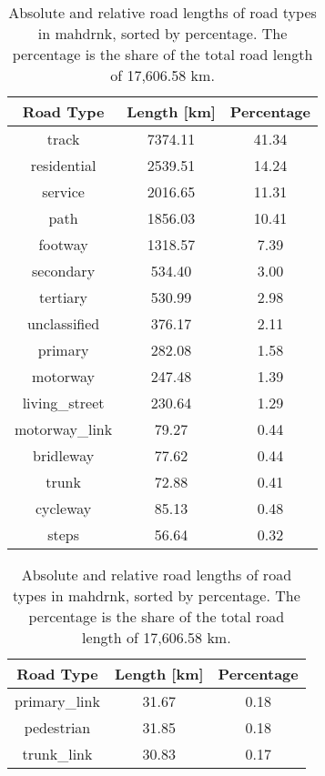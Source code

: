 \begin{table}[htb]
    \centering
    \caption[Road Lengths of ]{Absolute and relative road lengths of road types in \gls{mahdrnk}, sorted by percentage. The percentage is the share of the total road length of 17,606.58 km.}
    \begin{minipage}{.495\textwidth}
        \centering
        \begin{tabular}{ccc}
            \toprule
            \textbf{Road Type} & \textbf{Length [km]} & \textbf{Percentage} \\
            \midrule
            track & 7374.11 & 41.34 \\
            residential & 2539.51 & 14.24 \\
            service & 2016.65 & 11.31 \\
            path & 1856.03 & 10.41 \\
            footway & 1318.57 & 7.39 \\
            secondary & 534.40 & 3.00 \\
            tertiary & 530.99 & 2.98 \\
            unclassified & 376.17 & 2.11 \\
            primary & 282.08 & 1.58 \\
            motorway & 247.48 & 1.39 \\
            living\_street & 230.64 & 1.29 \\
            motorway\_link & 79.27 & 0.44 \\
            bridleway & 77.62 & 0.44 \\
            trunk & 72.88 & 0.41 \\
            cycleway & 85.13 & 0.48 \\
            steps & 56.64 & 0.32 \\
            \bottomrule
        \end{tabular}
    \end{minipage}
    \begin{minipage}{.495\textwidth}
        \centering
        \begin{tabular}{ccc}
            \toprule
            \textbf{Road Type} & \textbf{Length [km]} & \textbf{Percentage} \\
            \midrule
            primary\_link & 31.67 & 0.18 \\
            pedestrian & 31.85 & 0.18 \\
            trunk\_link & 30.83 & 0.17 \\

\end{tabular}
\end{minipage}
\end{table}
